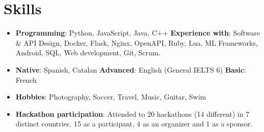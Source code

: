 \documentclass[letterpaper,11pt]{article}
\newcommand{\resumeSubHeadingListStart}{\begin{itemize}[leftmargin=*]}
\newcommand{\resumeSubHeadingListEnd}{\end{itemize}}
\begin{document}
\section{Skills}
  \resumeSubHeadingListStart
    \item{
      \textbf{Programming}{: Python, JavaScript, Java, C++}
      \textbf{Experience with}{: Software \& API Design, Docker, Flask, Nginx, OpenAPI, Ruby, Lua, ML Frameworks, Android, SQL, Web development, Git, Scrum.}
    }
    \item{
      \textbf{Native}{: Spanish, Catalan}
      \textbf{Advanced}{: English (General IELTS 6)}
      \textbf{Basic}{: French}
    }
    \item{
      \textbf{Hobbies}{: Photography, Soccer, Travel, Music, Guitar, Swim}
    }
    \item{
      \textbf{Hackathon participation}{: Attended to 20 hackathons (14 different) in 7 distinct countries. 15 as a participant, 4 as an organizer and 1 as a sponsor.}
    }
  \resumeSubHeadingListEnd


\end{document}
